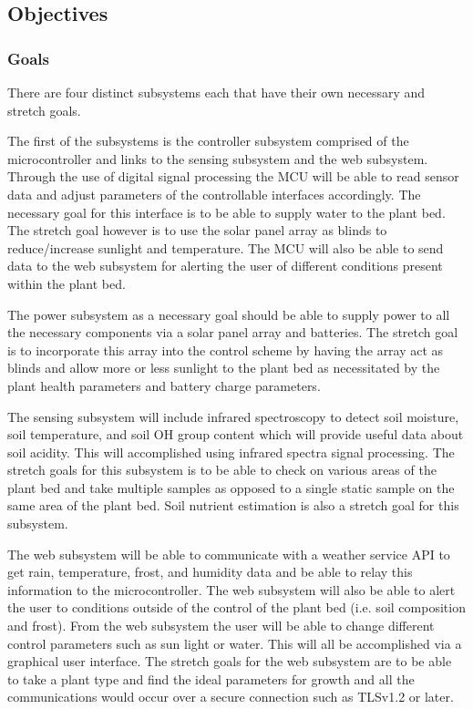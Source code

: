 \subsection{Objectives}
\subsubsection{Goals}
There are four distinct subsystems each that have their own necessary and stretch goals.

The first of the subsystems is the controller subsystem comprised of the microcontroller and links to the sensing subsystem and the web subsystem. Through the use of digital signal processing the MCU will be able to read sensor data and adjust parameters of the controllable interfaces accordingly. The necessary goal for this interface is to be able to supply water to the plant bed. The stretch goal however is to use the solar panel array as blinds to reduce/increase sunlight and temperature. The MCU will also be able to send data to the web subsystem for alerting the user of different conditions present within the plant bed.

The power subsystem as a necessary goal should be able to supply power to all the necessary components via a solar panel array and batteries. The stretch goal is to incorporate this array into the control scheme by having the array act as blinds and allow more or less sunlight to the plant bed as necessitated by the plant health parameters and battery charge parameters.

The sensing subsystem will include infrared spectroscopy to detect soil moisture, soil temperature, and soil OH group content which will provide useful data about soil acidity. This will accomplished using infrared spectra signal processing. The stretch goals for this subsystem is to be able to check on various areas of the plant bed and take multiple samples as opposed to a single static sample on the same area of the plant bed. Soil nutrient estimation is also a stretch goal for this subsystem.

The web subsystem will be able to communicate with a weather service API to get rain, temperature, frost, and humidity data and be able to relay this information to the microcontroller. The web subsystem will also be able to alert the user to conditions outside of the control of the plant bed (i.e. soil composition and frost). From the web subsystem the user will be able to change different control parameters such as sun light or water. This will all be accomplished via a graphical user interface. The stretch goals for the web subsystem are to be able to take a plant type and find the ideal parameters for growth and all the communications would occur over a secure connection such as TLSv1.2 or later.
